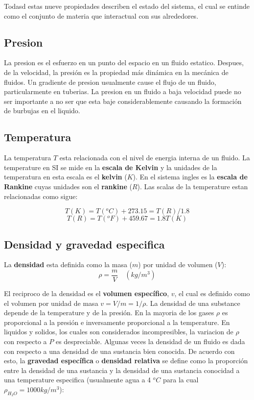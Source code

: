 \documentclass[10pt, oneside]{article}
\begin{document}
Todasd estas nueve propiedades describen el estado del sistema, el cual se entinde como el conjunto de materia que interactual con sus alrededores.

\subsection{Presion}
La presion es el esfuerzo en un punto del espacio en un fluido estatico. Despues, de la velocidad, la presi\'on es la propiedad m\'as din\'amica en la mec\'anica de fluidos. Un gradiente de presion usualmente cause el flujo de un fluido, particularmente en tuberias. La presion en un fluido a baja velocidad puede no ser importante a no ser que esta baje considerablemente causando la formaci\'on de burbujas en el liquido. 

\subsection{Temperatura}
La temperatura $T$ esta relacionada con el nivel de energia interna de un fluido. La temperature  en SI se mide en la \textbf{escala de Kelvin} y la unidades de la temperatura en esta escala es el \textbf{kelvin} ($K$). En el sistema ingles es la \textbf{escala de Rankine} cuyas unidades son el \textbf{rankine} ($R$). Las scalas de la temperature estan relacionadas como sigue:

\begin{equation}
T(K)=T(^oC) + 273.15 = T(R)/1.8
\end{equation}
\begin{equation}
T(R)=T(^oF) + 459.67 = 1.8T(K)
\end{equation}

\subsection{Densidad y gravedad especifica}
La \textbf{densidad} esta definida como la masa ($m$) por unidad de volumen ($V$):
\begin{equation}
\rho = \frac{m}{V} \quad (kg/m^3)
\end{equation}

El reciproco de la densidad es el \textbf{volumen espec\'ifico}, $v$, el cual es definido como el volumen por unidad de masa $v=V/m=1/\rho$.
La densidad de una substance depende de la temperature y de la presi\'on. En la mayoria de los gases $\rho$ es proporcional a la presi\'on e inversamente proporcional a la temperature. En liquidos y solidos, los cuales son considerados incompresibles, la variacion de $\rho$ con respecto a $P$ es despreciable. 
Algunas veces la densidad de un fluido es dada con respecto a una densidad de una sustancia bien conocida. De acuerdo con esto, la \textbf{gravedad espec\'ifica} o \textbf{densidad relativa} se define como la proporci\'on entre la densidad de una sustancia y la densidad de una sustancia conocidad a una temperature especifica (usualmente agua a 4 $^oC$ para la cual $\rho_{H_2 O}=1000 kg/m^3$):
\end{document}
